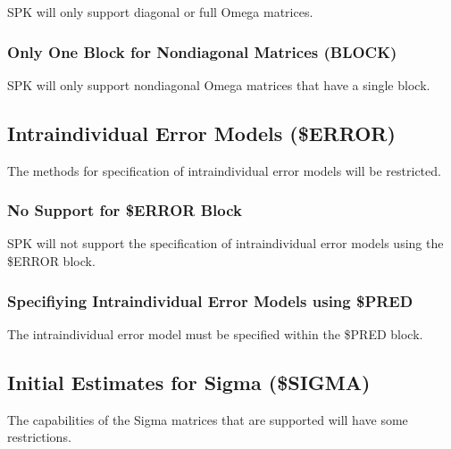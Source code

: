 \documentclass{article}
\begin{document}
SPK will only support diagonal or full Omega matrices.


\subsubsection{Only One Block for Nondiagonal Matrices (BLOCK)}

SPK will only support nondiagonal Omega matrices that 
have a single block.


\subsection{Intraindividual Error Models (\$ERROR)}

The methods for specification of intraindividual error models will
be restricted.


\subsubsection{No Support for \$ERROR Block}

SPK will not support the specification of intraindividual error
models using the \$ERROR block.


\subsubsection{Specifiying Intraindividual Error Models using \$PRED}

The intraindividual error model must be specified within the
\$PRED block.


\subsection{Initial Estimates for Sigma (\$SIGMA)}

The capabilities of the Sigma matrices that are supported will 
have some restrictions.
\end{document}
